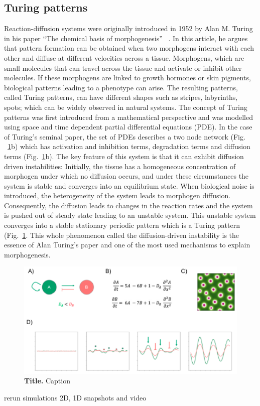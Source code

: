 \subsection{Turing patterns}
Reaction-diffusion systems were originally introduced in 1952 by Alan M. Turing in his paper “The chemical basis of morphogenesis” ~\parencite{Turing1952}.
In this article, he argues that pattern formation can be obtained when two morphogens interact with each other and diffuse at different
velocities across a tissue.
Morphogens, which are small molecules that can travel across the tissue and activate or inhibit other molecules.
If these morphogens are linked to growth hormones or skin pigments, biological patterns leading to a phenotype can arise.
The resulting patterns, called Turing patterns, can have different shapes such as stripes, labyrinths, spots; which can be widely observed in natural systems.
The concept of Turing patterns was first introduced from a mathematical perspective and was modelled using space and time dependent partial differential equations (PDE). In the case of Turing’s seminal paper, the set of PDEs describes a two node network (Fig. ~\ref{fig:intro_to_turing_patterns}b) which has activation and inhibition terms, degradation terms and diffusion terms (Fig.~\ref{fig:intro_to_turing_patterns}b).
The key feature of this system is that it can exhibit diffusion driven instabilities: Initially, the tissue has a homogeneous concentration of morphogen under which no diffusion occurs, and under these circumstances the system is stable and converges into an equilibrium state.
When biological noise is introduced, the heterogeneity of the system leads to morphogen diffusion.
Consequently, the diffusion leads to changes in the reaction rates and the system is pushed out of steady state leading to an unstable system.
This unstable system converges into a stable stationary periodic pattern which is a Turing pattern (Fig.~\ref{fig:intro_to_turing_patterns}.
This whole phenomenon called the diffusion-driven instability is the essence of Alan Turing’s paper and one of the most used mechanisms to explain morphogenesis.

\begin{figure}[h!]
    \centering
    \includegraphics[width=1\textwidth]{chapters/Introduction/intro_to_turing_patterns}
    \caption{\textbf{Title.} Caption}
    \label{fig:intro_to_turing_patterns}
\end{figure}
rerun simulations 2D, 1D snapshots and video


